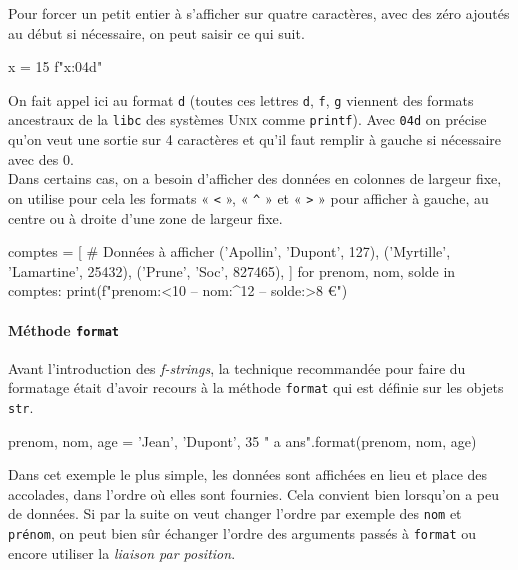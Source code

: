 Pour forcer un petit entier à s'afficher sur quatre caractères, avec des zéro ajoutés au début si nécessaire, on peut saisir ce qui suit.

\begin{idleconsole}
	\begin{pyconsole}
		x = 15
		f"{x:04d}"
	\end{pyconsole}
\end{idleconsole}

On fait appel ici au format \texttt{d} (toutes ces lettres \texttt{d}, \texttt{f}, \texttt{g} viennent des formats ancestraux de la \texttt{libc} des systèmes \textsc{Unix} comme \texttt{printf}). Avec \texttt{04d} on précise qu'on veut une sortie sur 4 caractères et qu'il faut remplir à gauche si nécessaire avec des $0$.\\[1.5pt]
\indent Dans certains cas, on a besoin d'afficher des données en colonnes de largeur fixe, on utilise pour cela les formats « \texttt{<} », « \texttt{\textasciicircum} » et « \texttt{>} » pour afficher à gauche, au centre ou à droite d'une zone de largeur fixe.

\begin{idleconsole}
\begin{pyconsole}
comptes = [ # Données à afficher
 ('Apollin', 'Dupont', 127),
 ('Myrtille', 'Lamartine', 25432),
 ('Prune', 'Soc', 827465),
]
for prenom, nom, solde in comptes:
	print(f"{prenom:<10} -- {nom:^12} -- {solde:>8} €")

\end{pyconsole}
\end{idleconsole}

\vspace{-0.5pt}

\paragraph{Méthode {\normalfont\texttt{format}}}
Avant l'introduction des \textit{f-strings}, la technique recommandée pour faire du formatage était d'avoir recours à la méthode \texttt{format} qui est définie sur les objets \texttt{str}.

\begin{idleconsole}
	\begin{pyconsole}
		prenom, nom, age = 'Jean', 'Dupont', 35
		"{} {} a {} ans".format(prenom, nom, age)
	\end{pyconsole}
\end{idleconsole}

Dans cet exemple le plus simple, les données sont affichées en lieu et place des accolades, dans l'ordre où elles sont fournies.
Cela convient bien lorsqu'on a peu de données. %
Si par la suite on veut changer l'ordre par exemple des \texttt{nom} et \texttt{prénom}, on peut bien sûr échanger l'ordre des arguments passés à \texttt{format} ou encore utiliser la \emph{liaison par position}.

